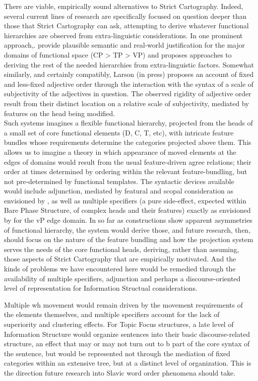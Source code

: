 \documentclass[output=paper,colorlinks,citecolor=brown,
]{langscibook}
\begin{document}
There are viable, empirically sound alternatives to Strict Cartography. Indeed, several current lines of research are specifically focused on question deeper than those that Strict Cartography can ask, attempting to derive whatever functional hierarchies are observed from extra-linguistic considerations. In one prominent approach,. \citealt{ramchand2014deriving} provide plausible semantic and real-world justification for the major domains of functional space (CP > TP > VP) and proposes approaches to deriving the rest of the needed hierarchies from extra-linguistic factors. Somewhat similarly, and certainly compatibly, Larson (in press) proposes an account of fixed and less-fixed adjective order through the interaction with the syntax of a scale of subjectivity of the adjectives in question. The observed rigidity of adjective order result from their distinct location on a relative scale of subjectivity, mediated by features on the head being modified. \\
Such systems imagines a flexible functional hierarchy, projected from the heads of a small set of core functional elements (D, C, T, etc), with intricate feature bundles whose requirements determine the categories projected above them. This allows us to imagine a theory in which appearance of moved elements at the edges of domains would result from the usual feature-driven agree relations; their order at times determined by ordering within the relevant feature-bundling, but not pre-determined by functional templates. The syntactic devices available would include adjunction, mediated by featural and scopal consideration as envisioned by \citet{Ernst2007}, as well as multiple specifiers (a pure side-effect, expected within Bare Phase Structure,  of complex heads and their features) exactly as envisioned by \citealt{Chomsky2001} for the vP edge domain. In so far as constructions show apparent asymmetries of functional hierarchy, the system would derive those, and future research, then, should focus on the nature of the feature bundling and how the projection system serves the needs of the core functional heads, deriving, rather than assuming, those aspects of Strict Cartography that are empirically motivated. And the kinds of problems we have encountered here would be remedied through the availability of multiple specifiers, adjunction and perhaps a discourse-oriented level of representation for Information Structual considerations. 
	
Multiple wh movement would remain driven by the movement requirements of the elements themselves, and multiple specifiers account for the lack of superiority and clustering effects.  For Topic Focus structures, a late level of Information Structure would organize sentences into their basic discourse-related structure, an effect that may or may not turn out to b part of the core syntax of the sentence, but would be represented not through the mediation of fixed categories within an extensive tree, but at a distinct level of organization. This is the direction future research into Slavic word order phenomena should take. 
\end{document}
